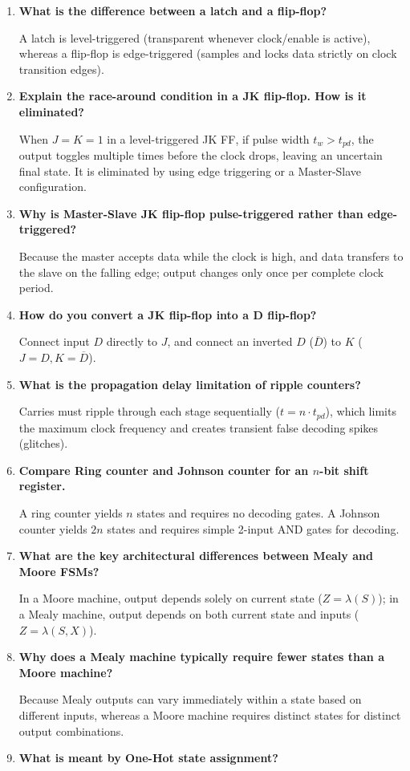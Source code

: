 \documentclass[12pt,a4paper]{article}
\newcommand{\Q}[1]{\textbf{#1}\par\noindent\ignorespaces}
\begin{document}
\begin{tcolorbox}[exambox, title={\textbf{Frequently Asked / Viva Questions}}]
\begin{enumerate}[topsep=0pt, label=\textbf{Q\arabic*.}, itemsep=5pt]
  \item \Q{What is the difference between a latch and a flip-flop?}
    A latch is level-triggered (transparent whenever clock/enable is active), whereas a flip-flop is edge-triggered (samples and locks data strictly on clock transition edges).
  \item \Q{Explain the race-around condition in a JK flip-flop. How is it eliminated?}
    When $J=K=1$ in a level-triggered JK FF, if pulse width $t_w > t_{pd}$, the output toggles multiple times before the clock drops, leaving an uncertain final state. It is eliminated by using edge triggering or a Master-Slave configuration.
  \item \Q{Why is Master-Slave JK flip-flop pulse-triggered rather than edge-triggered?}
    Because the master accepts data while the clock is high, and data transfers to the slave on the falling edge; output changes only once per complete clock period.
  \item \Q{How do you convert a JK flip-flop into a D flip-flop?}
    Connect input $D$ directly to $J$, and connect an inverted $D$ ($\overline{D}$) to $K$ ($J = D, K = \overline{D}$).
  \item \Q{What is the propagation delay limitation of ripple counters?}
    Carries must ripple through each stage sequentially ($t = n \cdot t_{pd}$), which limits the maximum clock frequency and creates transient false decoding spikes (glitches).
  \item \Q{Compare Ring counter and Johnson counter for an $n$-bit shift register.}
    A ring counter yields $n$ states and requires no decoding gates. A Johnson counter yields $2n$ states and requires simple 2-input AND gates for decoding.
  \item \Q{What are the key architectural differences between Mealy and Moore FSMs?}
    In a Moore machine, output depends solely on current state ($Z = \lambda(S)$); in a Mealy machine, output depends on both current state and inputs ($Z = \lambda(S, X)$).
  \item \Q{Why does a Mealy machine typically require fewer states than a Moore machine?}
    Because Mealy outputs can vary immediately within a state based on different inputs, whereas a Moore machine requires distinct states for distinct output combinations.
  \item \Q{What is meant by One-Hot state assignment?}

\end{enumerate}
\end{tcolorbox}
\end{document}

